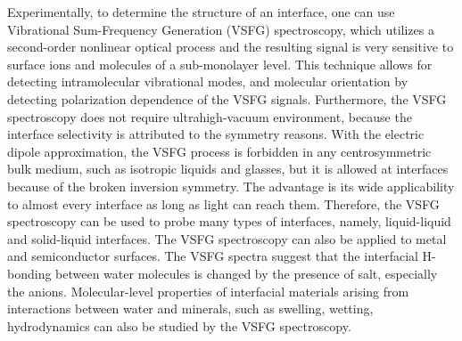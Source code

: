 Experimentally, to determine the structure of an interface, one can use Vibrational Sum-Frequency Generation (VSFG) spectroscopy,
which utilizes a second-order nonlinear optical process and the resulting signal is very sensitive to surface ions and 
molecules of a sub-monolayer level\cite{Morita2008,WangHongFei2015,WenYuChieh2016,Ishiyama2017,Penalber-Johnstone2018}. 
This technique allows for detecting intramolecular vibrational modes, and molecular orientation by detecting polarization dependence of the VSFG signals\cite{Vidal05}.  
Furthermore, the VSFG spectroscopy does not require ultrahigh-vacuum environment,
because the interface selectivity is attributed to the symmetry reasons\cite{WeiX02,Morita2018}.
With the electric dipole approximation, the VSFG process is forbidden in any centrosymmetric bulk medium\cite{Che2012},
such as isotropic liquids and glasses, but it is allowed at interfaces because of the broken inversion symmetry\cite{PF00}.
The advantage is its wide applicability to almost every interface as long as light can reach them. 
Therefore, the VSFG spectroscopy can be used to probe many types of interfaces, namely, liquid-liquid and 
solid-liquid interfaces\cite{Guyot-Sionnest1987,RS91,Du93,QD94,Richmond02,Gopalakrishnan2006,ShenYR2006,Morita2008}.
The VSFG spectroscopy can also be applied to metal and semiconductor surfaces\cite{Harris87,Superfine88}.
The VSFG spectra suggest that the interfacial H-bonding between water molecules is changed by the presence of salt, 
especially the anions\cite{EAR04}.
Molecular-level properties of interfacial materials arising from interactions between water and minerals, 
such as swelling, wetting, hydrodynamics can also be studied by the VSFG spectroscopy\cite{Rotenberg14}.

